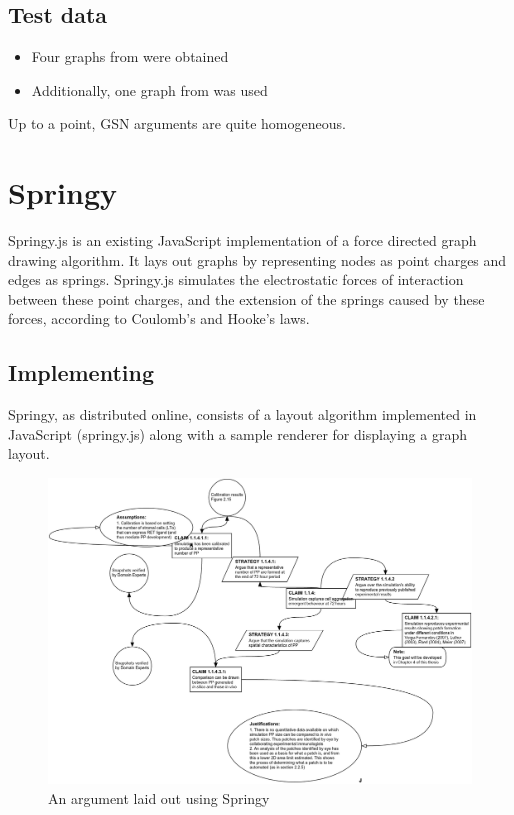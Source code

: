 \subsection{Test data}

\begin{itemize}
    \item Four graphs from \cite{aldenthesis} were obtained
    \item Additionally, one graph from \cite{gsnstandard} was used
\end{itemize}

Up to a point, GSN arguments are quite homogeneous.


\section{Springy}

Springy.js is an existing JavaScript implementation of a force directed graph drawing algorithm.
It lays out graphs by representing nodes as point charges and edges as springs. Springy.js simulates the electrostatic forces of interaction between these point charges, and the extension of the springs caused by these forces, according to Coulomb's and Hooke's laws.

\subsection{Implementing}

Springy, as distributed online, consists of a layout algorithm implemented in JavaScript (springy.js) along with a sample renderer for displaying a graph layout.

\begin{figure}
  \centering
  \includegraphics[width=\textwidth]{graphics/results/a4-springy.png}
  \caption{An argument laid out using Springy}
  \label{fig:dagre1}
\end{figure}


